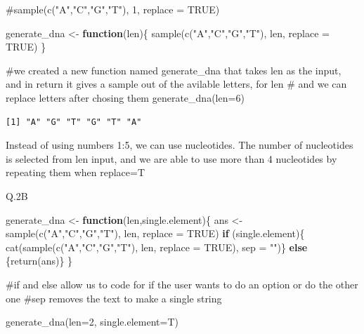 \documentclass[
  letterpaper,
  DIV=11,
  numbers=noendperiod]{scrartcl}
\newenvironment{Shaded}{\begin{snugshade}}{\end{snugshade}}
\newcommand{\AttributeTok}[1]{\textcolor[rgb]{0.40,0.45,0.13}{#1}}
\newcommand{\CommentTok}[1]{\textcolor[rgb]{0.37,0.37,0.37}{#1}}
\newcommand{\ConstantTok}[1]{\textcolor[rgb]{0.56,0.35,0.01}{#1}}
\newcommand{\ControlFlowTok}[1]{\textcolor[rgb]{0.00,0.23,0.31}{\textbf{#1}}}
\newcommand{\DecValTok}[1]{\textcolor[rgb]{0.68,0.00,0.00}{#1}}
\newcommand{\FunctionTok}[1]{\textcolor[rgb]{0.28,0.35,0.67}{#1}}
\newcommand{\NormalTok}[1]{\textcolor[rgb]{0.00,0.23,0.31}{#1}}
\newcommand{\OtherTok}[1]{\textcolor[rgb]{0.00,0.23,0.31}{#1}}
\newcommand{\StringTok}[1]{\textcolor[rgb]{0.13,0.47,0.30}{#1}}
\begin{document}
\begin{Shaded}
\begin{Highlighting}[]
\CommentTok{\#sample(c("A","C","G","T"), 1, replace = TRUE)}

\NormalTok{generate\_dna }\OtherTok{\textless{}{-}} \ControlFlowTok{function}\NormalTok{(len)\{}
  \FunctionTok{sample}\NormalTok{(}\FunctionTok{c}\NormalTok{(}\StringTok{"A"}\NormalTok{,}\StringTok{"C"}\NormalTok{,}\StringTok{"G"}\NormalTok{,}\StringTok{"T"}\NormalTok{), len, }\AttributeTok{replace =} \ConstantTok{TRUE}\NormalTok{)}
\NormalTok{\}}

\CommentTok{\#we created a new function named generate\_dna that takes len as the input, and in return it gives a sample out of the avilable letters, for len \# and we can replace letters after chosing them}
\FunctionTok{generate\_dna}\NormalTok{(}\AttributeTok{len=}\DecValTok{6}\NormalTok{)}
\end{Highlighting}
\end{Shaded}

\begin{verbatim}
[1] "A" "G" "T" "G" "T" "A"
\end{verbatim}

Instead of using numbers 1:5, we can use nucleotides. The number of
nucleotides is selected from len input, and we are able to use more than
4 nucleotides by repeating them when replace=T

Q.2B

\begin{Shaded}
\begin{Highlighting}[]
\NormalTok{generate\_dna }\OtherTok{\textless{}{-}} \ControlFlowTok{function}\NormalTok{(len,single.element)\{}
\NormalTok{ans }\OtherTok{\textless{}{-}} \FunctionTok{sample}\NormalTok{(}\FunctionTok{c}\NormalTok{(}\StringTok{"A"}\NormalTok{,}\StringTok{"C"}\NormalTok{,}\StringTok{"G"}\NormalTok{,}\StringTok{"T"}\NormalTok{), len, }\AttributeTok{replace =} \ConstantTok{TRUE}\NormalTok{)}
    \ControlFlowTok{if}\NormalTok{ (single.element)\{}
     \FunctionTok{cat}\NormalTok{(}\FunctionTok{sample}\NormalTok{(}\FunctionTok{c}\NormalTok{(}\StringTok{"A"}\NormalTok{,}\StringTok{"C"}\NormalTok{,}\StringTok{"G"}\NormalTok{,}\StringTok{"T"}\NormalTok{), len, }\AttributeTok{replace =} \ConstantTok{TRUE}\NormalTok{), }\AttributeTok{sep =} \StringTok{""}\NormalTok{)\}}
\ControlFlowTok{else}\NormalTok{ \{}\FunctionTok{return}\NormalTok{(ans)\}}
\NormalTok{\}}

\CommentTok{\#if and else allow us to code for if the user wants to do an option or do the other one}
\CommentTok{\#sep removes the text to make a single string}

\FunctionTok{generate\_dna}\NormalTok{(}\AttributeTok{len=}\DecValTok{2}\NormalTok{, }\AttributeTok{single.element=}\NormalTok{T)}
\end{Highlighting}
\end{Shaded}
\end{document}
